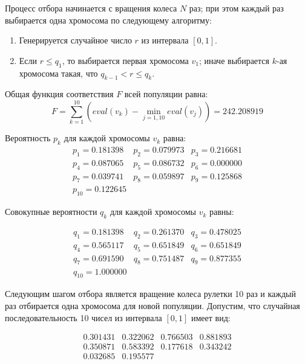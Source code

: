 Процесс отбора начинается с вращения колеса $N$ раз; при этом каждый раз выбирается
одна хромосома по следующему алгоритму:

\begin{enumerate}
  \item{Генерируется случайное число $r$ из интервала $[0,1]$.}
  \item{Если $r \leq q_1$, то выбирается первая хромосома $v_1$; иначе выбирается $k$-ая хромосома такая, что
    $q_{k-1} < r \leq q_k$}.
\end{enumerate}

Общая функция соответствия $F$ всей популяции равна:
\begin{equation*}
  F = \sum_{k=1}^{10}(eval(v_k) - \min\limits_{j=1,10}{eval(v_j)}) = 242.208919
\end{equation*}

Вероятность $p_k$ для каждой хромосомы $v_k$ равна:
\begin{equation*}
  \begin{array}{lll}
    p_1 = 0.181398 & p_2 = 0.079973 & p_3 = 0.216681 \\
    p_4 = 0.087065 & p_5 = 0.086732 & p_6 = 0.000000 \\
    p_7 = 0.039741 & p_8 = 0.059897 & p_9 = 0.125868 \\
    p_{10} = 0.122645
  \end{array}
\end{equation*}

Совокупные вероятности $q_k$ для каждой хромосомы $v_k$ равны:

\begin{equation*}
  \begin{array}{lll}
    q_1 = 0.181398 & q_2 = 0.261370 & q_3 = 0.478025 \\
    q_4 = 0.565117 & q_5 = 0.651849 & q_6 = 0.651849 \\
    q_7 = 0.691590 & q_8 = 0.751487 & q_9 = 0.877355 \\
    q_{10} = 1.000000
  \end{array}
\end{equation*}

Следующим шагом отбора является вращение колеса рулетки 10 раз и каждый раз отбирается одна
хромосома для новой популяции. Допустим, что случайная последовательность 10 чисел из
интервала $[0,1]$ имеет вид:

\begin{equation*}
  \begin{array}{llll}
    0.301431 & 0.322062 & 0.766503 & 0.881893 \\
    0.350871 & 0.583392 & 0.177618 & 0.343242 \\
    0.032685 & 0.195577
  \end{array}
\end{equation*}

